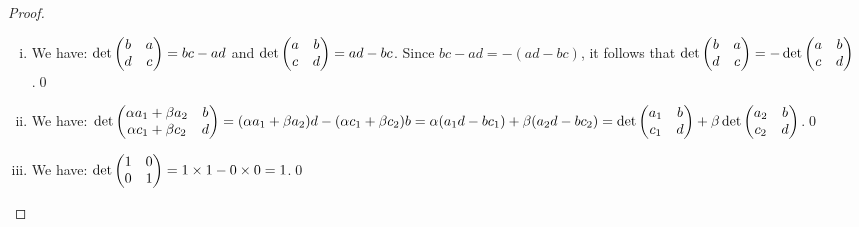 \begin{proof}
	\renewcommand{\qedsymbol}{$\blacksquare$}
	\begin{enumerate}[(i)]
		\item We have: $\det \begin{pmatrix} b &a\\ d &c \end{pmatrix}=bc-ad$ and $\det \begin{pmatrix} a &b\\ c &d \end{pmatrix}=ad-bc$.
		Since $bc-ad=-(ad-bc)$, it follows that $\det \begin{pmatrix} b &a\\ d &c \end{pmatrix}=-\det \begin{pmatrix} a &b\\ c &d \end{pmatrix}$.\qed
		\item We have: $\det \begin{pmatrix} \alpha a_1+\beta a_2 &b\\ \alpha c_1+\beta c_2 &d \end{pmatrix}=(\alpha a_1+\beta a_2)d-(\alpha c_1+\beta c_2)b=\alpha(a_1d-bc_1)+\beta(a_2d-bc_2)=\det \begin{pmatrix} a_1 &b\\ c_1 &d \end{pmatrix}+\beta\det \begin{pmatrix} a_2 &b\\ c_2 &d \end{pmatrix}$.\qed
		\item We have: $\det \begin{pmatrix} 1 &0\\ 0 &1 \end{pmatrix}=1\times 1-0\times 0=1$.\qed
	\end{enumerate}
	\renewcommand{\qedsymbol}{}
\end{proof}